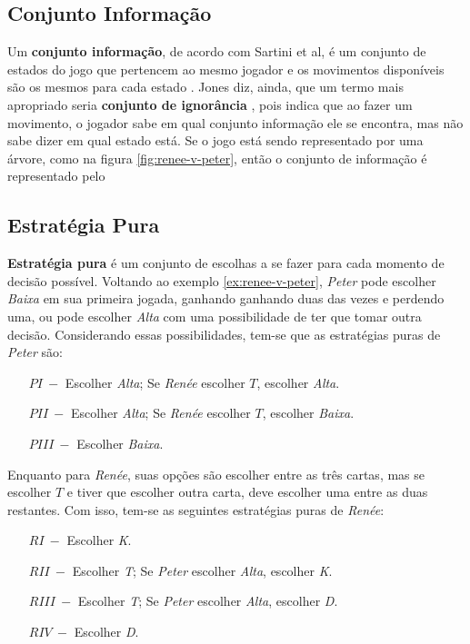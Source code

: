 \subsection{Conjunto Informação}
\label{subsec:conjunto-informacao}

Um \textbf{conjunto informação}, de acordo com Sartini et al, é um conjunto de estados do jogo que pertencem ao mesmo jogador e os movimentos disponíveis são os mesmos para cada estado \cite{sartini_IIbienaldasbm}. Jones diz, ainda, que um termo mais apropriado seria \textbf{conjunto de ignorância} \cite{jones_1980}, pois indica que ao fazer um movimento, o jogador sabe em qual conjunto informação ele se encontra, mas não sabe dizer em qual estado está. Se o jogo está sendo representado por uma árvore, como na figura \ref{fig:renee-v-peter}, então o conjunto de informação é representado pelo

\subsection{Estratégia Pura}
\label{subsec:estrategia-pura}

\textbf{Estratégia pura} é um conjunto de escolhas a se fazer para cada momento de decisão possível. Voltando ao exemplo \ref{ex:renee-v-peter}, \emph{Peter} pode escolher \emph{Baixa} em sua primeira jogada, ganhando ganhando duas das vezes e perdendo uma, ou pode escolher \emph{Alta} com uma possibilidade de ter que tomar outra decisão. Considerando essas possibilidades, tem-se que as estratégias puras de \emph{Peter} são:

\begin{enumerate}
	\tightlist
	\item[$ PI\ -$] Escolher \emph{Alta}; Se \emph{Renée} escolher $T$, escolher \emph{Alta}.
	\item[$ PII\ -$] Escolher \emph{Alta}; Se \emph{Renée} escolher $T$, escolher \emph{Baixa}.
	\item[$ PIII\ -$] Escolher \emph{Baixa}.
\end{enumerate}

Enquanto para \emph{Renée}, suas opções são escolher entre as três cartas, mas se escolher $T$ e tiver que escolher outra carta, deve escolher uma entre as duas restantes. Com isso, tem-se as seguintes estratégias puras de \emph{Renée}:

\begin{enumerate}
	\tightlist
	\item[$ RI\ -$] Escolher \emph{K}.
	\item[$ RII\ -$] Escolher \emph{T}; Se \emph{Peter} escolher \emph{Alta}, escolher \emph{K}.
	\item[$ RIII\ -$] Escolher \emph{T}; Se \emph{Peter} escolher \emph{Alta}, escolher \emph{D}.
	\item[$ RIV\ -$] Escolher \emph{D}.
\end{enumerate}

